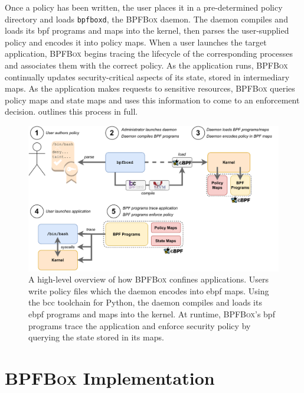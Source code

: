 \documentclass[
  fontsize=12pt,
  titlepage=firstiscover,
  paper=letter,
oneside,
  cleardoublepage=plain,
  parskip=half-,
  DIV=10,
  parindent,
  appendixprefix,
  chapterprefix,
  listof=totoc,
]{scrbook}
\newcommand{\bpfbox}{\textsc{BPFBox}}
\begin{document}
Once a policy has been written, the user places it in a pre-determined policy directory
and loads \texttt{bpfboxd}, the \bpfbox{} daemon. The daemon compiles and loads its
\gls{bpf} programs and maps into the kernel, then parses the user-supplied policy and
encodes it into policy maps. When a user launches the target application, \bpfbox{} begins
tracing the lifecycle of the corresponding processes and associates them with the correct
policy. As the application runs, \bpfbox{} continually updates security-critical aspects
of its state, stored in intermediary maps. As the application makes requests to sensitive
resources, \bpfbox{} queries policy maps and state maps and uses this information to come
to an enforcement decision.  outlines this process in full.

\begin{figure}[htpb]
  \centering
  \includegraphics[width=1\linewidth]{figs/bpfbox/overview.pdf}
  \caption[A high-level overview of how \bpfbox{} confines applications]{
    A high-level overview of how \bpfbox{} confines applications. Users write policy files
    which the daemon encodes into \gls{ebpf} maps. Using the bcc toolchain for Python, the
    daemon compiles and loads its \gls{ebpf} programs and maps into the kernel. At
    runtime, \bpfbox{}'s \gls{bpf} programs trace the application and enforce security
    policy by querying the state stored in its maps.
  }\label{fig:bpfbox-policy-overview}
\end{figure}



\section{\bpfbox{} Implementation}\label{s:bpfbox-implementation}
\end{document}
